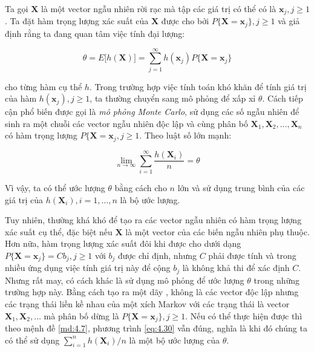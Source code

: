 \documentclass[14pt, a4paper]{article}
\numberwithin{equation}{section}
\numberwithin{figure}{section}
\theoremstyle{sltheorem}
\theoremstyle{soltheorem}
\numberwithin{dl}{section}
\numberwithin{md}{section}
\numberwithin{vd}{section}
\begin{document}
    Ta gọi $\mathbf{X}$ là một vector ngẫu nhiên rời rạc mà tập các giá trị có thể có là $\mathbf{x}_j, j \geq 1$.
    Ta đặt hàm trọng lượng xác suất của $\mathbf{X}$ được cho bởi $P \lbrace \mathbf{X} = \mathbf{x}_j \rbrace, j \geq 1$ và giả định rằng ta đang quan tâm việc tính đại lượng:

    \begin{equation*}
        \theta = E \lbrack h(\mathbf{X}) \rbrack = \sum_{j=1}^{\infty} h(\mathbf{x}_j) P \lbrace \mathbf{X} = \mathbf{x}_j \rbrace
    \end{equation*}

    cho từng hàm cụ thể $h$.
    Trong trường hợp việc tính toán khó khăn để tính giá trị của hàm $h(\mathbf{x}_j), j \geq 1$, ta thường chuyển sang mô phỏng để xấp xỉ $\theta$.
    Cách tiếp cận phổ biến được gọi là \textit{mô phỏng Monte Carlo}, sử dụng các số ngẫu nhiên để sinh ra một chuỗi các vector ngẫu nhiên độc lập và cùng phân bố $\mathbf{X}_1, \mathbf{X}_2, \dots, \mathbf{X}_n$ có hàm trọng lượng $P \lbrace \mathbf{X} = \mathbf{x}_j, j \geq 1$.
    Theo luật số lớn mạnh:

    \begin{equation} \label{eq:4.30}
        \lim_{n \rightarrow \infty} \sum_{i=1}^{\infty} \dfrac{h(\mathbf{X}_i)}{n} = \theta
    \end{equation}

    Vì vậy, ta có thể ước lượng $\theta$ bằng cách cho $n$ lớn và sử dụng trung bình của các giá trị của $h(\mathbf{X}_i), i=1, \dots, n$ là bộ ước lượng.

    Tuy nhiên, thường khá khó để tạo ra các vector ngẫu nhiên có hàm trọng lượng xác suất cụ thể, đặc biệt nếu $\mathbf{X}$ là một vector của các biến ngẫu nhiên phụ thuộc.
    Hơn nữa, hàm trọng lượng xác suất đôi khi được cho dưới dạng $P \lbrace \mathbf{X}=\mathbf{x}_j \rbrace = C b_j, j \geq 1$ với $b_j$ được chỉ định, nhưng $C$ phải được tính và trong nhiều ứng dụng việc tính giá trị này để cộng $b_j$ là không khả thi để xác định $C$.
    Nhưng rất may, có cách khác là sử dụng mô phỏng để ước lượng $\theta$ trong những trường hợp này.
    Bằng cách tạo ra một dãy , không là các vector độc lập nhưng các trạng thái liền kề nhau của một xích Markov với các trạng thái là vector $\mathbf{X}_1, \mathbf{X}_2, \dots$ mà phân bố dừng là $P \lbrace \mathbf{X} = \mathbf{x}_j \rbrace, j \geq 1$.
    Nếu có thể thực hiện được thì theo mệnh đề \ref{md:4.7}, phương trình \ref{eq:4.30} vẫn đúng, nghĩa là khi đó chúng ta có thể sử dụng $\sum_{i=1}^n h(\mathbf{X}_i)/n$ là một bộ ước lượng của $\theta$.
\end{document}
